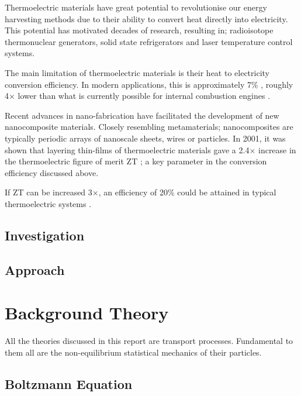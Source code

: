 \documentclass[12pt,draft]{article}
\begin{document}
Thermoelectric materials have great potential to revolutionise our energy harvesting methods due to their ability to convert heat directly into electricity. This potential has motivated decades of research, resulting in;  radioisotope thermonuclear generators, solid state refrigerators and laser temperature control systems.

The main limitation of thermoelectric materials is their heat to electricity conversion efficiency. In modern applications, this is approximately 7\% \cite{modern-thermoelectrics}, roughly 4$\times$ lower than what is currently possible for internal combustion engines \cite{engine-efficiency}.

Recent advances in nano-fabrication have facilitated the development of  new nanocomposite materials. Closely resembling metamaterials; nanocomposites are typically periodic arrays of nanoscale sheets, wires or particles. In 2001, it was shown that layering thin-films of thermoelectric materials gave a 2.4$\times$ increase in the thermoelectric figure of merit ZT \cite{nanocomposite-zt}; a key parameter in the conversion efficiency discussed above.

If ZT can be increased 3$\times$, an efficiency of 20\% could be attained in typical thermoelectric systems \cite{liu-review}. 

\subsection{Investigation}

\subsection{Approach}

\section{Background Theory}
All the theories discussed in this report are transport processes. Fundamental to them all are the non-equilibrium statistical mechanics of their particles.

\subsection{Boltzmann Equation}
\end{document}
